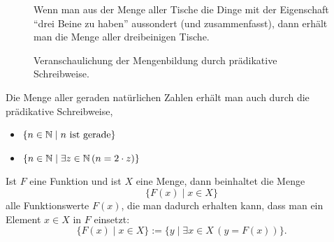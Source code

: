 \begin{figure}[h]
\begin{bsp}
Wenn man aus der Menge aller Tische die Dinge mit der Eigenschaft ``drei Beine zu haben'' aussondert (und zusammenfasst), dann erhält man die Menge aller dreibeinigen Tische.
\begin{center}
\begin{framed}
\def\firstcircle{(0,0) circle (2cm)}
\def\secondcircle{(0.5,-1.8) circle (1.5cm)}



\setlength{\parskip}{5mm}

\caption*{Veranschaulichung der Mengenbildung durch prädikative Schreibweise.}
\end{framed}
\end{center}
\end{bsp}
\end{figure}


\begin{bsp}
Die Menge aller geraden natürlichen Zahlen erhält man auch durch die prädikative Schreibweise,
\begin{itemize}
\item $\{n\in\mathbb{N}\mid n\text{ ist gerade}\}$
\item $\{n\in\mathbb{N}\mid \exists z\in\mathbb{N}\,(n=2\cdot z)\}$
\end{itemize}
\end{bsp}



\begin{df}[Ersetzungsschreibweise]
Ist $F$ eine Funktion und ist $X$ eine Menge, dann beinhaltet die Menge
\[
\big\{F(x)\mid x\in X \big\}
\]
alle Funktionswerte $F(x)$, die man dadurch erhalten kann, dass man ein Element $x\in X$ in $F$ einsetzt:
\[
\big\{F(x)\mid x\in X\big\}:=\{y\mid \exists x\in X\,(y=F(x))\}.
\]
\end{df}

